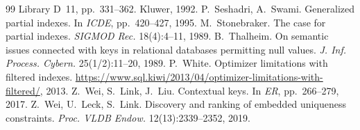 \documentclass[conference]{IEEEtran}
\theoremstyle{definition}
\begin{document}
\begin{thebibliography}{99}
  Library D~11, pp.~331--362. Kluwer, 1992.
\fi
{} P.~Seshadri, A.~Swami. Generalized partial indexes. In \emph{ICDE},
  pp.~420--427, 1995.
 M.~Stonebraker. The case for partial indexes. \emph{SIGMOD Rec.}
  18(4):4--11, 1989.
 B.~Thalheim. On semantic issues connected with keys in relational
  databases permitting null values. \emph{J. Inf. Process. Cybern.} 25(1/2):11--20, 1989.
 P.~White. Optimizer limitations with filtered indexes.
  \url{https://www.sql.kiwi/2013/04/optimizer-limitations-with-filtered/}, 2013.
 Z.~Wei, S.~Link, J.~Liu. Contextual keys. In \emph{ER}, pp.~266--279, 2017.
 Z.~Wei, U.~Leck, S.~Link. Discovery and ranking of embedded uniqueness
  constraints. \emph{Proc. VLDB Endow.} 12(13):2339--2352, 2019.
\end{thebibliography}
\end{document}
